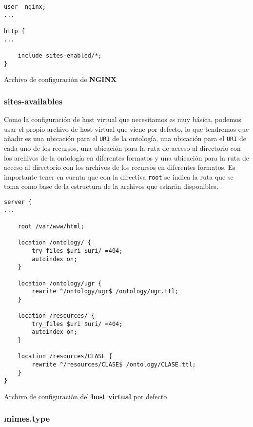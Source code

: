 \begin{listing}[!ht]
\begin{verbatim}
user  nginx;
...

http {
...

    include sites-enabled/*;
}
\end{verbatim}
\caption{Archivo de configuración de {\bf NGINX}}
\end{listing}

\subsubsection{sites-availables}

Como la configuración de host virtual que necesitamos es muy básica, podemos usar el propio archivo de host virtual que viene por defecto, lo que tendremos que añadir es una ubicación para el {\tt URI} de la ontología, una ubicación para el {\tt URI} de cada uno de los recursos, una ubicación para la ruta de acceso al directorio con los archivos de la ontología en diferentes formatos y una ubicación para la ruta de acceso al directorio con los archivos de los recursos en diferentes formatos. Es importante tener en cuenta que con la directiva {\tt root} se indica la ruta que se toma como base de la estructura de la archivos que estarán disponibles.

\bigskip
\begin{listing}[!ht]
\begin{verbatim}
server {
...

    root /var/www/html;
	
    location /ontology/ {
        try_files $uri $uri/ =404;
        autoindex on;
    }
	
    location /ontology/ugr {
        rewrite ^/ontology/ugr$ /ontology/ugr.ttl;
    }

    location /resources/ {
        try_files $uri $uri/ =404;
        autoindex on;
    }

    location /resources/CLASE {
        rewrite ^/resources/CLASE$ /ontology/CLASE.ttl;
    }
}
\end{verbatim}
\caption{Archivo de configuración del {\bf host virtual} por defecto}
\end{listing}

\subsubsection{mimes.type}

